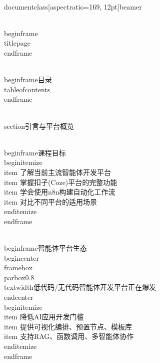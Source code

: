 \\documentclass[aspectratio=169, 12pt]{beamer}
\begin{document}
\\begin{frame}
\\titlepage
\\end{frame}

\\begin{frame}{目录}
\\tableofcontents
\\end{frame}

\\section{引言与平台概览}

\\begin{frame}{课程目标}
\\begin{itemize}
    \\item 了解当前主流智能体开发平台
    \\item 掌握扣子(Coze)平台的完整功能
    \\item 学会使用n8n构建自动化工作流
    \\item 对比不同平台的适用场景
\\end{itemize}
\\end{frame}

\\begin{frame}{智能体平台生态}
\\begin{center}
\\framebox{\\parbox{0.8\\textwidth}{低代码/无代码智能体开发平台正在爆发}}
\\end{center}
\\begin{itemize}
    \\item 降低AI应用开发门槛
    \\item 提供可视化编排、预置节点、模板库
    \\item 支持RAG、函数调用、多智能体协作
\\end{itemize}
\\end{frame}
\end{document}
